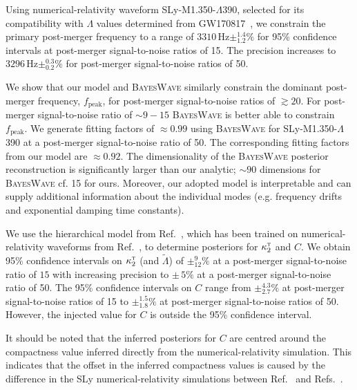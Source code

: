 \documentclass[../Thesis.tex]{subfiles}
\begin{document}
    Using numerical-relativity waveform SLy-M1.350-$\Lambda$390, selected for its compatibility with $\Lambda$ values determined from GW170817~\cite[e.g.,][]{GW170817Detection,Annala2018,Radice2018,Most2018,De2018,GW170817Properties}, we constrain the primary post-merger frequency to a range of $3310$\,Hz$\pm_{1.2}^{1.4}\%$ for 95\% confidence intervals at post-merger signal-to-noise ratios of 15.
    The precision increases to $3296$\,Hz$\pm_{0.2}^{0.3}\%$ for post-merger signal-to-noise ratios of 50. \par
    We show that our model and \textsc{BayesWave} similarly constrain the dominant post-merger frequency, $f_{\mathrm{peak}}$, for post-merger signal-to-noise ratios of $\gtrsim 20$.
    For post-merger signal-to-noise ratio of $\sim 9 - 15$ \textsc{BayesWave} is better able to constrain $f_{\mathrm{peak}}$.
    We generate fitting factors of  $\approx 0.99$ using \textsc{BayesWave} for SLy-M1.350-$\Lambda$390 at a post-merger signal-to-noise ratio of 50.
    The corresponding fitting factors from our model are $\approx 0.92$.
    The dimensionality of the \textsc{BayesWave} posterior reconstruction is significantly larger than our analytic; $\sim 90$ dimensions for \textsc{BayesWave} cf. 15 for ours.
    Moreover, our adopted model is interpretable and can supply additional information about the individual modes (e.g. frequency drifts and exponential damping time constants).
     \par
    We use the hierarchical model from Ref.~\cite{Easter2019}, which has been trained on numerical-relativity waveforms from Ref.~\cite{Rezzolla2016}, to determine posteriors for $\kappa_2^\textsc{t}$ and $C$. 
    We obtain 95\% confidence intervals on $\kappa_2^\textsc{t}$ (and $\tilde{\Lambda}$) of $\pm^{9}_{12}\%$ at a post-merger signal-to-noise ratio of $15$ with increasing precision to $\pm\, 5\%$ at a post-merger signal-to-noise ratio of 50. 
    The 95\% confidence intervals on $C$ range from $\pm^{4.3}_{2.7}\%$ at post-merger signal-to-noise ratios of 15 to $\pm^{1.5}_{1.8}\%$ at post-merger signal-to-noise ratios of 50.
    However, the injected value for $C$ is outside the 95\% confidence interval. \par
    It should be noted that the inferred posteriors for $C$ are centred around the compactness value inferred directly from the numerical-relativity simulation.
    This indicates that the offset in the inferred compactness values is caused by the difference in the SLy numerical-relativity simulations between Ref.~\cite{Rezzolla2016} and Refs.~\cite{Dietrich2017b,Radice2016}.
\end{document}
